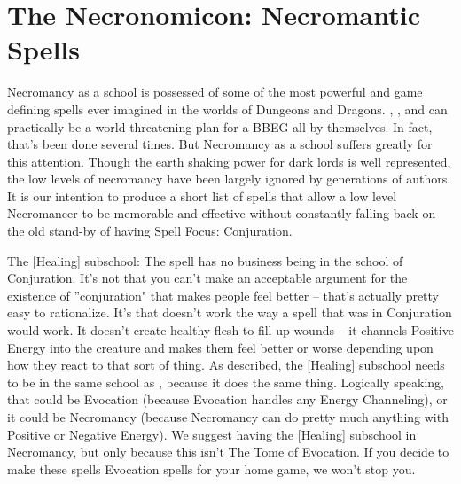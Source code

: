 \section{The Necronomicon: Necromantic Spells}

Necromancy as a school is possessed of some of the most powerful and game defining spells ever imagined in the worlds of Dungeons and Dragons. , , and  can practically be a world threatening plan for a BBEG all by themselves. In fact, that's been done several times. But Necromancy as a school suffers greatly for this attention. Though the earth shaking power for dark lords is well represented, the low levels of necromancy have been largely ignored by generations of authors. It is our intention to produce a short list of spells that allow a low level Necromancer to be memorable and effective without constantly falling back on the old stand-by of having Spell Focus: Conjuration.

The [Healing] subschool:
The spell  has no business being in the school of Conjuration. It's not that you can't make an acceptable argument for the existence of ''conjuration" that makes people feel better -- that's actually pretty easy to rationalize. It's that  doesn't work the way a spell that was in Conjuration would work. It doesn't create healthy flesh to fill up wounds -- it channels Positive Energy into the creature and makes them feel better or worse depending upon how they react to that sort of thing. As described, the [Healing] subschool needs to be in the same school as , because it does the same thing. Logically speaking, that could be Evocation (because Evocation handles any Energy Channeling), or it could be Necromancy (because Necromancy can do pretty much anything with Positive or Negative Energy). We suggest having the [Healing] subschool in Necromancy, but only because this isn't The Tome of Evocation. If you decide to make these spells Evocation spells for your home game, we won't stop you.\\


